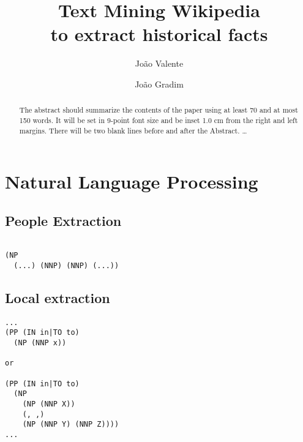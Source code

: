 \documentclass{llncs}
\begin{document}
\mainmatter              %
%
\title{Text Mining Wikipedia\\to extract historical facts}
%
%
\author{João Valente \and João Gradim}
%
%
%

\maketitle              %

\begin{abstract}
The abstract should summarize the contents of the paper
using at least 70 and at most 150 words. It will be set in 9-point
font size and be inset 1.0 cm from the right and left margins.
There will be two blank lines before and after the Abstract. \dots
\end{abstract}

\section{Natural Language Processing}

\subsection{People Extraction}

\begin{verbatim}

(NP
  (...) (NNP) (NNP) (...))

\end{verbatim}

\subsection{Local extraction}

\begin{verbatim}
...
(PP (IN in|TO to)
  (NP (NNP x))

or

(PP (IN in|TO to)
  (NP
	(NP (NNP X))
	(, ,)
	(NP (NNP Y) (NNP Z))))
...
\end{verbatim}
\end{document}
